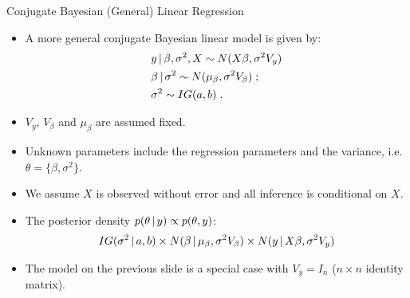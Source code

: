 \begin{frame}{Conjugate Bayesian (General) Linear Regression}
 
\begin{itemize}\setlength{\itemsep}{0.1cm}
 \item \vskip-2mm A more general conjugate Bayesian linear model is given by:
\begin{align*}
& y \,|\, \beta,\sigma^2, X \sim N(X\beta, \sigma^2 V_y)\\
& \beta \,|\, \sigma^2 \sim N(\mu_{\beta}, \sigma^2 V_{\beta})\;;\\
& \sigma^2 \sim IG(a,b)\; .
\end{align*}

\item $V_y$, $V_{\beta}$ and $\mu_{\beta}$ are assumed fixed.

\item Unknown parameters include the regression parameters and the variance, i.e. $\theta = \{\beta, \sigma^2\}$. 

\item We assume $X$ is observed without error and all inference is conditional on $X$.

\item The posterior density $p(\theta \,|\, y) \propto p(\theta, y)$:
\begin{align*}
 IG(\sigma^2\,|\, a,b) \times N(\beta \,|\, \mu_{\beta}, \sigma^2 V_{\beta}) \times N(y \,|\, X\beta, \sigma^2 V_{y})
\end{align*}

\item The model on the previous slide is a special case with $V_y = I_n$ ($n\times n$ identity matrix).
\end{itemize}

\end{frame}

